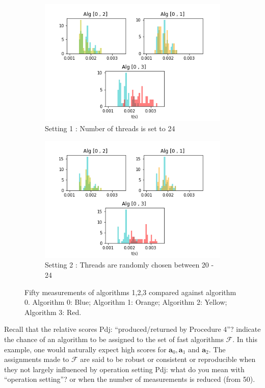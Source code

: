 \documentclass[conference]{IEEEtran}
\newcommand{\p}[1]{{\color{blue} Pdj: #1}}
\begin{document}
\begin{figure}
	\centering
	\begin{subfigure}[b]{0.5\textwidth}
		\includegraphics[width=1\linewidth]{fig/f_noise}
		\caption{Setting 1 : Number of threads is set to 24}
		\label{fig:Ng1}
	\end{subfigure}
	
	\begin{subfigure}[b]{0.5\textwidth}
		\includegraphics[width=1\linewidth]{fig/f}
		\caption{Setting 2 : Threads are randomly chosen between 20 - 24}
		\label{fig:Ng2} 
	\end{subfigure}
	\caption{Fifty measurements of algorithms 1,2,3 compared against algorithm 0.  Algorithm 0: Blue;  Algorithm 1: Orange; Algorithm 2: Yellow; Algorithm 3: Red.}
	\label{fig:d}
\end{figure}

Recall that the relative scores \p{``produced/returned by Procedure 4''?} indicate the chance of an algorithm to be
assigned to the set of fast algorithms $\mathcal{F}$. In this example, one would naturally expect high scores for
$\mathbf{a}_0, \mathbf{a}_1$ and $\mathbf{a}_2$. The assignments made to $\mathcal{F}$ are said to be robust or
consistent or reproducible when they not largely influenced by operation setting \p{what do you mean with ``operation
  setting''?} or when the number of measurements is reduced (from 50).
\end{document}
